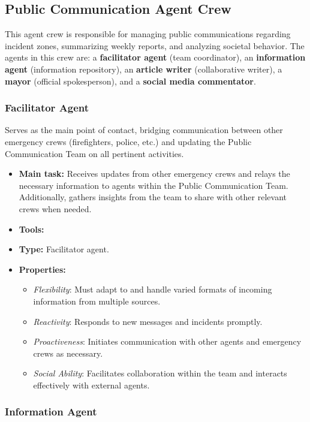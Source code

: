 \subsection{Public Communication Agent Crew}

This agent crew is responsible for managing public communications regarding incident zones, summarizing weekly reports, and analyzing societal behavior. The agents in this crew are: a \textbf{facilitator agent} (team coordinator), an \textbf{information agent} (information repository), an \textbf{article writer} (collaborative writer), a \textbf{mayor} (official spokesperson), and a \textbf{social media commentator}.

\subsubsection{Facilitator Agent}

Serves as the main point of contact, bridging communication between other emergency crews (firefighters, police, etc.) and updating the Public Communication Team on all pertinent activities.

\begin{itemize}
    \item \textbf{Main task:} Receives updates from other emergency crews and relays the necessary information to agents within the Public Communication Team. Additionally, gathers insights from the team to share with other relevant crews when needed.
    \item \textbf{Tools:} 
    \item \textbf{Type:} Facilitator agent.
    \item \textbf{Properties:}
    \begin{itemize}
        \item \emph{Flexibility}: Must adapt to and handle varied formats of incoming information from multiple sources.
        \item \emph{Reactivity}: Responds to new messages and incidents promptly.
        \item \emph{Proactiveness}: Initiates communication with other agents and emergency crews as necessary.
        \item \emph{Social Ability}: Facilitates collaboration within the team and interacts effectively with external agents.
    \end{itemize}
\end{itemize}

\subsubsection{Information Agent}


